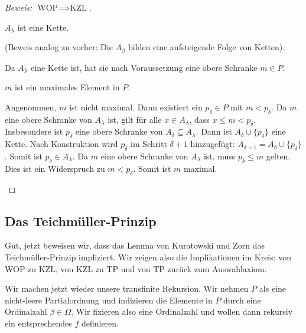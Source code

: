 \begin{proof}[Beweis: $\text{WOP} \implies \text{KZL}$]
\begin{math-stroke}
\begin{claim}
$A_\lambda$ ist eine Kette.
\end{claim}
(Beweis analog zu vorher: Die $A_\beta$ bilden eine aufsteigende Folge von Ketten).

Da $A_\lambda$ eine Kette ist, hat sie nach Voraussetzung eine obere Schranke $m \in P$.

\begin{claim}
$m$ ist ein maximales Element in $P$.
\end{claim}
\begin{short-proof}
Angenommen, $m$ ist nicht maximal. Dann existiert ein $p_\delta \in P$ mit $m < p_\delta$.
Da $m$ eine obere Schranke von $A_\lambda$ ist, gilt für alle $x \in A_\lambda$, dass $x \le m < p_\delta$.
Insbesondere ist $p_\delta$ eine obere Schranke von $A_\delta \subseteq A_\lambda$.
Dann ist $A_\delta \cup \{p_\delta\}$ eine Kette.
Nach Konstruktion wird $p_\delta$ im Schritt $\delta+1$ hinzugefügt: $A_{\delta+1} = A_\delta \cup \{p_\delta\}$.
Somit ist $p_\delta \in A_\lambda$.
Da $m$ eine obere Schranke von $A_\lambda$ ist, muss $p_\delta \le m$ gelten.
Dies ist ein Widerspruch zu $m < p_\delta$.
Somit ist $m$ maximal.
\end{short-proof}
\end{math-stroke}
\end{proof}

\begin{ai-global-state-checkpoint-invisible-content}
\end{ai-global-state-checkpoint-invisible-content}

\subsection{Das Teichmüller-Prinzip}

\begin{spoken-clean}[00:56:45 - 00:58:30]
Gut, jetzt beweisen wir, dass das Lemma von Kuratowski und Zorn das Teichmüller-Prinzip impliziert. Wir zeigen also die Implikationen im Kreis: von WOP zu KZL, von KZL zu TP und von TP zurück zum Auswahlaxiom. 

Wir machen jetzt wieder unsere transfinite Rekursion. Wir nehmen $P$ als eine nicht-leere Partialordnung und indizieren die Elemente in $P$ durch eine Ordinalzahl $\beta \in \Omega$. Wir fixieren also eine Ordinalzahl und wollen dann rekursiv ein entsprechendes $f$ definieren.
\end{spoken-clean}

